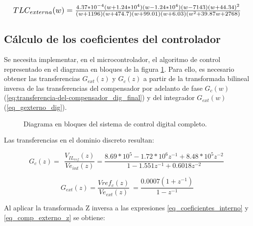 \begin{equation*}
	\resizebox{.99\hsize}{!}
	{
		$
		TLC_{externa}(w)=\frac{4.37*10^{-4} (w+1.24*10^{4}) (w-1.24*10^{4}) (w-7143) (w+44.34)^2}{(w+1196) (w+474.7) (w+99.01) (w+6.03) (w^2 + 39.87w + 2768)}
		$
	}
\end{equation*}



\subsection{Cálculo de los coeficientes del controlador}

Se necesita implementar, en el microcontrolador, el algoritmo de control representado en el diagrama en bloques de la figura \ref{fig:diag-en-bloques-comp_digital_completo}. Para ello, es necesario obtener las transferencias $G_{ext}(z)$ y $G_c(z)$ a partir de la transformada bilineal inversa de las transferencias del compensador por adelanto de fase $G_c(w)$ (\ref{eq:transferencia-del-compensador_dig_final}) y del integrador $G_{ext}(w)$ (\ref{eq_gexterno_dig}). 

\begin{figure}[H]
	\centering
	\scalebox{0.8}{}
	\caption{Diagrama en bloques del sistema de control digital completo.}	\label{fig:diag-en-bloques-comp_digital_completo}
\end{figure}

Las transferencias en el dominio discreto resultan: 

%
%

\begin{equation} \label{eq_coeficientes_interno} 
	G_c(z)=\ \ \frac{V_{IL_{ref}}(z)}{Ve_{int}(z)}=\frac{8.69*10^5- 1.72*10^6z^{-1} + 8.48*10^5z^{-2}}{1-1.551 z^{-1} + 0.6018 z^{-2}}\  
\end{equation} 

\begin{equation} \label{eq_comp_externo_z} 
	G_{ext}(z)=\frac{Vref_c(z)}{Ve_{ext}(z)}\ =\frac{0.0007(1+z^{-1})}{1-z^{-1}} 
\end{equation} 


Al aplicar la transformada Z inversa a las expresiones \ref{eq_coeficientes_interno} y \ref{eq_comp_externo_z} se obtiene:

